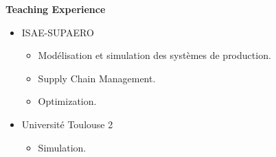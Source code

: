\textbf{Teaching Experience}

    \begin{itemize}
        \item ISAE-SUPAERO
        \begin{itemize}
            \item Modélisation et simulation des systèmes de production.
            \item Supply Chain Management.
            \item Optimization.
        \end{itemize}
        \item Université Toulouse 2
        \begin{itemize}
            \item Simulation.
        \end{itemize}
    \end{itemize}